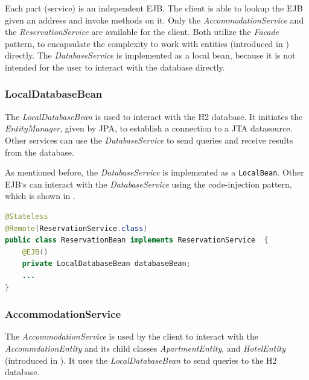 Each part (service) is an independent EJB. The client is able to lookup the EJB given an address and invoke methods on it. Only the \textit{AccommodationService} and the \textit{ReservationService} are available for the client. Both utilize the \textit{Facade} pattern, to encapsulate the complexity to work with entities (introduced in ) directly. The \textit{DatabaseService} is implemented as a local bean, because it is not intended for the user to interact with the database directly.


\subsubsection{LocalDatabaseBean}\label{sec:02_design_beans_local}
The \textit{LocalDatabaseBean} is used to interact with the H2 database. It initiates the \textit{EntityManager}, given by JPA, to establish a connection to a JTA datasource. Other services can use the \textit{DatabaseService} to send queries and receive results from the database.

As mentioned before, the \textit{DatabaseService} is implemented as a \texttt{LocalBean}. Other EJB`s can interact with the \textit{DatabaseService} using the code-injection pattern, which is shown in .
\begin{lstlisting}[label=lst:02_design_ejb_db_cinjection, caption=Usage of the \textit{LocalDatabaseBean} using code-injection, language=java]
@Stateless
@Remote(ReservationService.class)
public class ReservationBean implements ReservationService  {
    @EJB()
    private LocalDatabaseBean databaseBean;
    ...
}
\end{lstlisting}


\subsubsection{AccommodationService}\label{sec:02_design_beans_acc}
The \textit{AccommodationService} is used by the client to interact with the \textit{AccommdationEntity} and its child classes \textit{ApartmentEntity}, and \textit{HotelEntity} (introduced in ). It uses the \textit{LocalDatabaseBean} to send queries to the H2 database.

